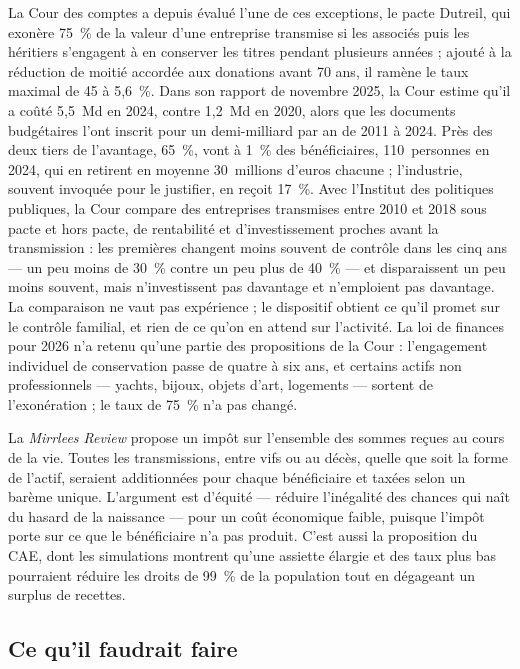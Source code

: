\documentclass[11pt,a4paper]{article}
\providecommand{\euro}{\texteuro}
\begin{document}
La Cour des comptes a depuis évalué l'une de ces exceptions, le pacte Dutreil, qui exonère 75~\% de
la valeur d'une entreprise transmise si les associés puis les héritiers s'engagent à en
conserver les titres pendant plusieurs années ; ajouté à la réduction de moitié accordée aux donations avant 70 ans, il ramène le
taux maximal de 45 à 5,6~\%. Dans son rapport de novembre 2025, la Cour estime qu'il a coûté
5,5~Md\euro{} en 2024, contre 1,2~Md\euro{} en 2020, alors que les documents budgétaires l'ont
inscrit pour un demi-milliard par an de 2011 à 2024. Près des deux tiers de l'avantage, 65~\%, vont
à 1~\% des bénéficiaires, 110~personnes en 2024, qui en retirent en moyenne 30~millions d'euros
chacune ; l'industrie, souvent invoquée pour le justifier, en reçoit 17~\%. Avec l'Institut des
politiques publiques, la Cour compare des entreprises transmises entre 2010 et 2018 sous pacte et
hors pacte, de rentabilité et d'investissement proches avant la transmission : les premières
changent moins souvent de contrôle dans les cinq ans --- un peu moins de 30~\% contre un peu plus de
40~\% --- et disparaissent un peu moins souvent, mais n'investissent pas davantage et n'emploient
pas davantage. La comparaison ne vaut pas expérience ; le dispositif obtient ce qu'il promet sur le
contrôle familial, et rien de ce qu'on en attend sur l'activité. La loi de finances pour 2026 n'a retenu
qu'une partie des propositions de la Cour : l'engagement individuel de conservation passe de quatre à six ans, et certains actifs non
professionnels --- yachts, bijoux, objets d'art, logements --- sortent de l'exonération ; le taux de 75~\% n'a pas changé.

La \emph{Mirrlees Review} propose un impôt sur l'ensemble des sommes reçues au cours de la vie.
Toutes les transmissions, entre vifs ou au décès, quelle que soit la forme de l'actif, seraient
additionnées pour chaque bénéficiaire et taxées selon un barème unique. L'argument est d'équité ---
réduire l'inégalité des chances qui naît du hasard de la naissance --- pour un coût économique
faible, puisque l'impôt porte sur ce que le bénéficiaire n'a pas produit. C'est aussi la proposition
du CAE, dont les simulations montrent qu'une assiette élargie et des taux plus bas pourraient
réduire les droits de 99~\% de la population tout en dégageant un surplus de recettes.

\subsection{Ce qu'il faudrait faire}
\end{document}
